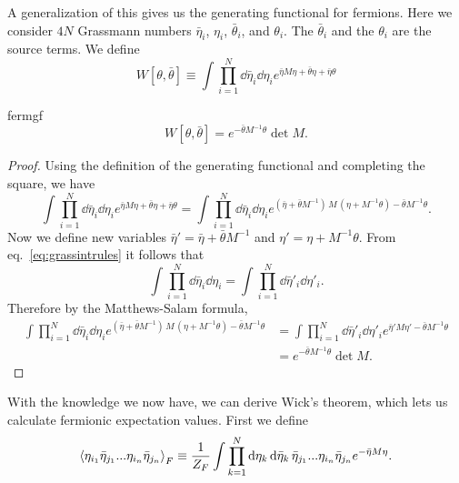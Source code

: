 A generalization of this gives us the generating functional
for fermions. Here we consider $4N$ Grassmann numbers $\bar{\eta}_i$,
$\eta_i$, $\bar{\theta}_i$, and $\theta_i$. The $\bar{\theta}_i$
and the $\theta_i$ are the source terms. We define
\begin{equation}\label{eq:deffermgf}
  W[\theta,\bar{\theta}]\equiv\int \prod_{i=1}^N\dd{\bar{\eta}_i}\dd{\eta_i}
   e^{\bar{\eta}M\eta+\bar{\theta}\eta+\bar{\eta}\theta}
\end{equation}
\begin{theorem}{}{fermgf}
$$
   W[\theta,\bar{\theta}]=e^{-\bar{\theta}M^{-1}\theta}\det M.
$$
\begin{proof} Using the definition of the generating functional and
completing the square, we have 
$$
  \int \prod_{i=1}^N\dd{\bar{\eta}_i}\dd{\eta_i}
   e^{\bar{\eta}M\eta+\bar{\theta}\eta+\bar{\eta}\theta}
   =\int \prod_{i=1}^N\dd{\bar{\eta}_i}\dd{\eta_i}
   e^{(\bar{\eta}+\bar{\theta}M^{-1})\,M\,
             (\eta+M^{-1}\theta)-\bar{\theta}M^{-1}\theta}.
$$
Now we define new variables $\bar{\eta}'=\bar{\eta}+\bar{\theta}M^{-1}$
and $\eta'=\eta+M^{-1}\theta$. From eq.~\eqref{eq:grassintrules} it follows
that
$$
  \int \prod_{i=1}^N\dd{\bar{\eta}_i}\dd{\eta_i}=
  \int \prod_{i=1}^N\dd{\bar{\eta}'_i}\dd{\eta'_i}.
$$
Therefore by the Matthews-Salam formula,
\begin{equation*}\begin{aligned}
   \int \prod_{i=1}^N\dd{\bar{\eta}_i}\dd{\eta_i}
   e^{(\bar{\eta}+\bar{\theta}M^{-1})\,M\,
             (\eta+M^{-1}\theta)-\bar{\theta}M^{-1}\theta}
   &=\int \prod_{i=1}^N\dd{\bar{\eta}'_i}\dd{\eta'_i}
    e^{\bar{\eta}'M\eta'-\bar{\theta}M^{-1}\theta}\\
   &=e^{-\bar{\theta}M^{-1}\theta}\det M.
\end{aligned}\end{equation*}
\end{proof}
\end{theorem}
With the knowledge we now have, we can derive Wick's theorem, which lets us
calculate fermionic expectation values. First we define 
\begin{equation}\label{eq:deffermev}
  \ev{\eta_{i_1}\bar{\eta}_{j_1}...\eta_{i_n}\bar{\eta}_{j_n}}_F
  \equiv\frac{1}{Z_F}\int\prod_{k=1}^N\dd{\eta_k}\dd{\bar{\eta}_k}
        \bar{\eta}_{j_1}...\eta_{i_n}\bar{\eta}_{j_n}
        e^{-\bar{\eta}M\eta}.
\end{equation}
